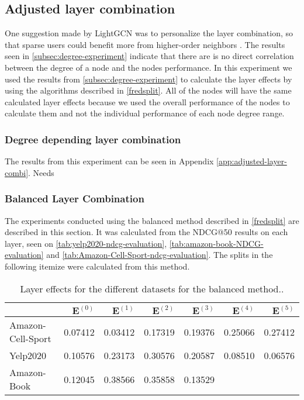 \subsection{Adjusted layer combination}\label{subsec:adjusted-layer-combination}
One suggestion made by LightGCN was to personalize the layer combination, so that sparse users could benefit more from higher-order neighbors \cite{lightgcn}.
The results seen in \autoref{subsec:degree-experiment} indicate that there are is no direct correlation between the degree of a node and the nodes performance.
In this experiment we used the results from \autoref{subsec:degree-experiment} to calculate the layer effects by using the algorithms described in \autoref{fredsplit}.
All of the nodes will have the same calculated layer effects because we used the overall performance of the nodes to calculate them and not the individual performance of each node degree range.

\subsubsection{Degree depending layer combination}
The results from this experiment can be seen in Appendix \ref{app:adjusted-layer-combi}.
Needs

\subsubsection{Balanced Layer Combination}
The experiments conducted using the balanced method described in \autoref{fredsplit} are described in this section.
It was calculated from the NDCG@50 results on each layer, seen on \autoref{tab:yelp2020-ndcg-evaluation}, \autoref{tab:amazon-book-NDCG-evaluation} and \autoref{tab:Amazon-Cell-Sport-ndcg-evaluation}.
The splits in the following itemize were calculated from this method.
\begin{table*}[]
    \centering
    \begin{tabular}{|l|r|r|r|r|r|r|}
        \hline
                          & $\mathbf{E}^{(0)}$ & $\mathbf{E}^{(1)}$ & $\mathbf{E}^{(2)}$ & $\mathbf{E}^{(3)}$ & $\mathbf{E}^{(4)}$ & $\mathbf{E}^{(5)}$ \\ \hline
        Amazon-Cell-Sport & 0.07412            & 0.03412            & 0.17319            & 0.19376            & 0.25066            & 0.27412            \\ \hline
        Yelp2020          & 0.10576            & 0.23173            & 0.30576            & 0.20587            & 0.08510            & 0.06576            \\ \hline
        Amazon-Book       & 0.12045            & 0.38566            & 0.35858            & 0.13529            &                    &                    \\ \hline
    \end{tabular}
    \caption{Layer effects for the different datasets for the balanced method..}
    \label{tab:layer-effect}
\end{table*}

